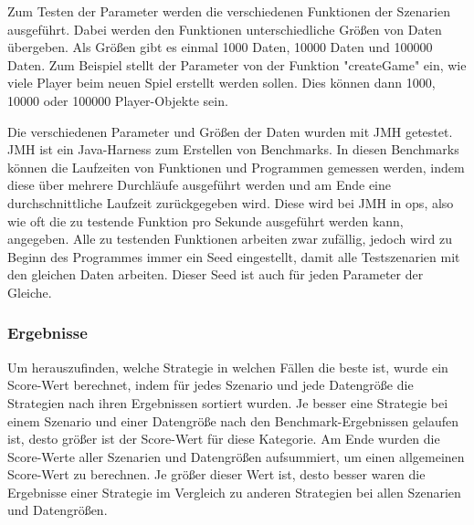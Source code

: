 Zum Testen der Parameter werden die verschiedenen Funktionen der Szenarien ausgeführt. Dabei werden den Funktionen unterschiedliche Größen von Daten übergeben. Als Größen gibt es einmal 1000 Daten, 10000 Daten und 100000 Daten. Zum Beispiel stellt der Parameter von der Funktion "createGame" ein, wie viele Player beim neuen Spiel erstellt werden sollen. Dies können dann 1000, 10000 oder 100000 Player-Objekte sein.

Die verschiedenen Parameter und Größen der Daten wurden mit JMH getestet. JMH ist ein Java-Harness zum Erstellen von Benchmarks. In diesen Benchmarks können die Laufzeiten von Funktionen und Programmen gemessen werden, indem diese über mehrere Durchläufe ausgeführt werden und am Ende eine durchschnittliche Laufzeit zurückgegeben wird. Diese wird bei JMH in \ac{ops}, also wie oft die zu testende Funktion pro Sekunde ausgeführt werden kann, angegeben.\cite{githubGitHubOpenjdkjmh} Alle zu testenden Funktionen arbeiten zwar zufällig, jedoch wird zu Beginn des Programmes immer ein Seed eingestellt, damit alle Testszenarien mit den gleichen Daten arbeiten. Dieser Seed ist auch für jeden Parameter der Gleiche.

\subsubsection{Ergebnisse}
Um herauszufinden, welche Strategie in welchen Fällen die beste ist, wurde ein Score-Wert berechnet, indem für jedes Szenario und jede Datengröße die Strategien nach ihren Ergebnissen sortiert wurden. Je besser eine Strategie bei einem Szenario und einer Datengröße nach den Benchmark-Ergebnissen gelaufen ist, desto größer ist der Score-Wert für diese Kategorie. Am Ende wurden die Score-Werte aller Szenarien und Datengrößen aufsummiert, um einen allgemeinen Score-Wert zu berechnen. Je größer dieser Wert ist, desto besser waren die Ergebnisse einer Strategie im Vergleich zu anderen Strategien bei allen Szenarien und Datengrößen. 

